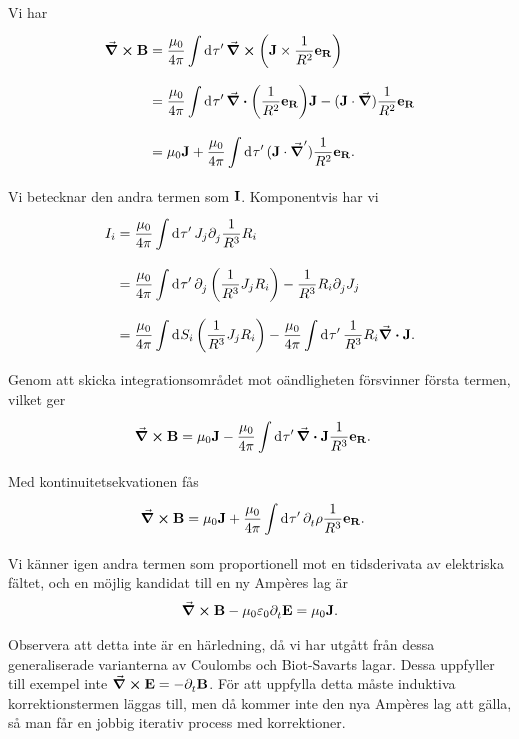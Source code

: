 Vi har
\begin{align*}
	\curl{\vb{B}} &= \frac{\mu_{0}}{4\pi}\int\limits_{}^{}\dd[]{\tau'}\curl(\vb{J}\times\frac{1}{R^{2}}\vb{e}_{\vb{R}}) \\
	              &= \frac{\mu_{0}}{4\pi}\int\limits_{}^{}\dd[]{\tau'}\div(\frac{1}{R^{2}}\vb{e}_{\vb{R}})\vb{J} - (\vb{J}\cdot\grad)\frac{1}{R^{2}}\vb{e}_{\vb{R}} \\
	              &= \mu_{0}\vb{J} + \frac{\mu_{0}}{4\pi}\int\limits_{}^{}\dd[]{\tau'}(\vb{J}\cdot\grad')\frac{1}{R^{2}}\vb{e}_{\vb{R}}.
\end{align*}
Vi betecknar den andra termen som $\vb{I}$. Komponentvis har vi
\begin{align*}
	I_{i} &= \frac{\mu_{0}}{4\pi}\int\limits_{}^{}\dd[]{\tau'}J_{j}\partial_{j}^{}\frac{1}{R^{3}}R_{i} \\
	      &= \frac{\mu_{0}}{4\pi}\int\limits_{}^{}\dd[]{\tau'}\partial_{j}^{}\left(\frac{1}{R^{3}}J_{j}R_{i}\right) - \frac{1}{R^{3}}R_{i}\partial_{j}^{}J_{j} \\
	      &= \frac{\mu_{0}}{4\pi}\int\limits_{}^{}\dd[]{S_{i}}\left(\frac{1}{R^{3}}J_{j}R_{i}\right) - \frac{\mu_{0}}{4\pi}\int\limits_{}^{}\dd[]{\tau'}\frac{1}{R^{3}}R_{i}\div{\vb{J}}.
\end{align*}
Genom att skicka integrationsområdet mot oändligheten försvinner första termen, vilket ger
\begin{align*}
	\curl{\vb{B}} &= \mu_{0}\vb{J} - \frac{\mu_{0}}{4\pi}\int\limits_{}^{}\dd[]{\tau'}\div{\vb{J}}\frac{1}{R^{3}}\vb{e}_{\vb{R}}.
\end{align*}
Med kontinuitetsekvationen fås
\begin{align*}
	\curl{\vb{B}} &= \mu_{0}\vb{J} + \frac{\mu_{0}}{4\pi}\int\limits_{}^{}\dd[]{\tau'}\partial_{t}^{}\rho\frac{1}{R^{3}}\vb{e}_{\vb{R}}.
\end{align*}
Vi känner igen andra termen som proportionell mot en tidsderivata av elektriska fältet, och en möjlig kandidat till en ny Ampères lag är
\begin{align*}
	\curl{\vb{B}} - \mu_{0}\varepsilon_{0}\partial_{t}^{}\vb{E} = \mu_{0}\vb{J}.
\end{align*}

Observera att detta inte är en härledning, då vi har utgått från dessa generaliserade varianterna av Coulombs och Biot-Savarts lagar. Dessa uppfyller till exempel inte $\curl{\vb{E}} = -\partial_{t}^{}\vb{B}$. För att uppfylla detta måste induktiva korrektionstermen läggas till, men då kommer inte den nya Ampères lag att gälla, så man får en jobbig iterativ process med korrektioner.